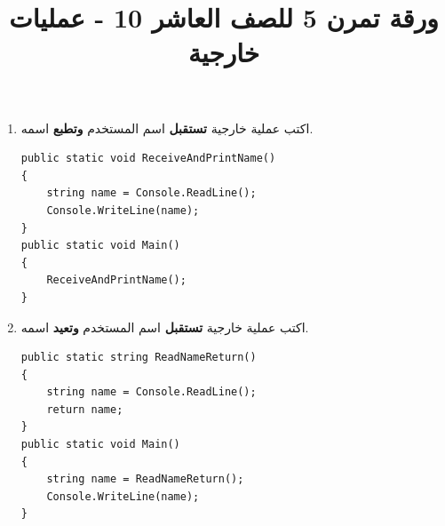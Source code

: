 ﻿\documentclass[14pt]{extarticle}
\title{ورقة تمرن 5 للصف العاشر 10 - عمليات خارجية}
\begin{document}
\maketitle
\thispagestyle{fancy}

\ifwithsols
\begin{enumerate}[itemsep=3em]
\else
\begin{enumerate}
\fi


\begin{boxAttention}
    \begin{itemize}
\item عندما يٌطلب "عملية خارجية \textbf{تستقبل}" يجب ان يكون المستخدم يدخل قيمة للمتغير. أي عليك استعمال \texttt{Console.ReadLine()}.

\item أما عندما يُطلب منك "عملية خارجية \textbf{تتلقى}" فهذا يعني أنّها تتلقى المطلوب كبارمترات.

\item عندما يُطلب منك كتابة "برنامج" فهذا يعني كتابة داخل \texttt{Main()}.

\item إذا كانت العملية تعيد قيمة ما، فعليك حفظ القيمة التي تعيدها في متغير عند استدعائها. \\
أما إذا كانت لا تعيد أي قيمة، فإنّك تكتب اسمها فقط عند استدعائها، وتعطيها بارمتراتها إن وجدت.

\end{itemize}
\end{boxAttention}

\item اكتب عملية خارجية \textbf{تستقبل} اسم المستخدم \textbf{وتطبع} اسمه.
\ifwithsols
\begin{boxSolution}
\begin{english}
\begin{verbatim}
public static void ReceiveAndPrintName()
{
    string name = Console.ReadLine();
    Console.WriteLine(name);
}
public static void Main()
{
    ReceiveAndPrintName();
}
\end{verbatim}
\end{english}
\end{boxSolution}
\clearpage
\fi


\item اكتب عملية خارجية \textbf{تستقبل} اسم المستخدم \textbf{وتعيد} اسمه.
\ifwithsols
\begin{boxSolution}
\begin{english}
\begin{verbatim}
public static string ReadNameReturn()
{
    string name = Console.ReadLine();
    return name;
}
public static void Main()
{
    string name = ReadNameReturn();
    Console.WriteLine(name);
}
\end{verbatim}
\end{english}
\end{boxSolution}
\fi



\end{enumerate}
\end{enumerate}
\end{document}
